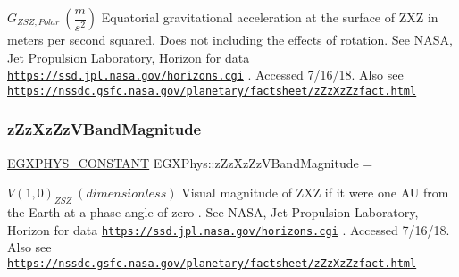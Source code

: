 $ G_{ZSZ,Polar} \ (\dfrac{m}{s^2})$ Equatorial gravitational acceleration at the surface of Z\+XZ in meters per second squared. Does not including the effects of rotation. See N\+A\+SA, Jet Propulsion Laboratory, Horizon for data \href{https://ssd.jpl.nasa.gov/horizons.cgi}{\tt https\+://ssd.\+jpl.\+nasa.\+gov/horizons.\+cgi} . Accessed 7/16/18. Also see \href{https://nssdc.gsfc.nasa.gov/planetary/factsheet/zZzXzZzfact.html}{\tt https\+://nssdc.\+gsfc.\+nasa.\+gov/planetary/factsheet/z\+Zz\+Xz\+Zzfact.\+html} \mbox{\label{group___e_g_x_phys-_constants-_astrophysics-_solar_system-_z_x_z-_bulk_ga6590c7fb0a5f810e3bbaa1ea51d961c5}} 
\subsubsection{\texorpdfstring{z\+Zz\+Xz\+Zz\+V\+Band\+Magnitude}{zZzXzZzVBandMagnitude}}
{\footnotesize\ttfamily \mbox{\hyperlink{group___e_g_x_phys-_constants-_macros_ga76980d288494ce1714c9ac68a95ba702}{E\+G\+X\+P\+H\+Y\+S\+\_\+\+C\+O\+N\+S\+T\+A\+NT}} E\+G\+X\+Phys\+::z\+Zz\+Xz\+Zz\+V\+Band\+Magnitude =}

$ V(1,0)_{ZSZ} \ (dimensionless)$ Visual magnitude of Z\+XZ if it were one AU from the Earth at a phase angle of zero . See N\+A\+SA, Jet Propulsion Laboratory, Horizon for data \href{https://ssd.jpl.nasa.gov/horizons.cgi}{\tt https\+://ssd.\+jpl.\+nasa.\+gov/horizons.\+cgi} . Accessed 7/16/18. Also see \href{https://nssdc.gsfc.nasa.gov/planetary/factsheet/zZzXzZzfact.html}{\tt https\+://nssdc.\+gsfc.\+nasa.\+gov/planetary/factsheet/z\+Zz\+Xz\+Zzfact.\+html} \mbox{\label{group___e_g_x_phys-_constants-_astrophysics-_solar_system-_z_x_z-_bulk_ga3a87b316b68dbefdd6a13d67d92f6e3e}} 

